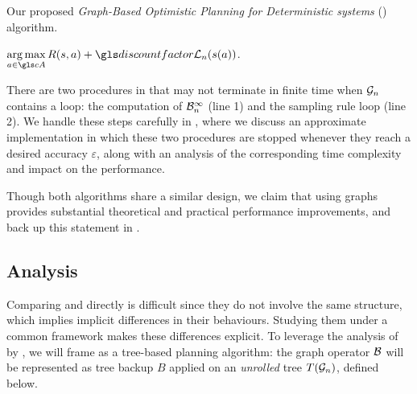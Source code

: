 \begin{algorithm}[!ht]
	\caption{Our proposed \emph{Graph-Based Optimistic Planning for Deterministic systems} (\GBOPD) algorithm.}
	\label{alg:gbop-d}
	\DontPrintSemicolon
	\Return $\displaystyle\argmax_{a\in \cA} R(s,a) + \discount \cL_n(s(a))$. 
\end{algorithm}

\begin{remark}
	\begin{leftbar}[remarkbar]
	There are two procedures in \GBOPD that may not terminate in finite time when $\mathcal{G}_n$ contains a loop:
		the computation of $\mathcal{B}_n^\infty$ (line 1) and
		the sampling rule loop (line 2).
	We handle these steps carefully in , where we discuss an approximate implementation in which these two procedures are stopped whenever they reach a desired accuracy $\varepsilon$, along with an analysis of the corresponding time complexity and impact on the performance.
	\end{leftbar}
\end{remark}

Though both algorithms share a similar design, we claim that using graphs provides substantial theoretical and practical performance improvements, and back up this statement in .

\subsection{Analysis}
\label{sec:gbop-analysis}

Comparing \OPD and \GBOPD directly is difficult since they do not involve the same structure, which implies implicit differences in their behaviours. Studying them under a common framework makes these differences explicit. To leverage the analysis of \OPD by \citet{Hren2008}, we will frame \GBOPD as a tree-based planning algorithm: the graph operator $\mathcal{B}$ will be represented as tree backup $B$ applied on an \emph{unrolled} tree $T(\mathcal{G}_n)$, defined below.

